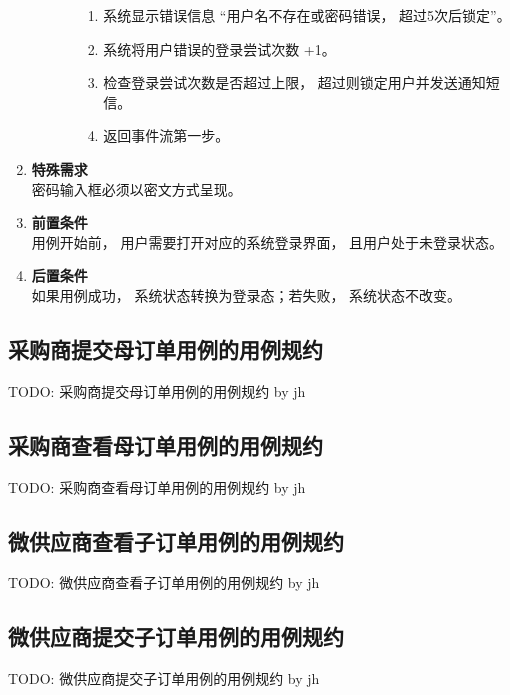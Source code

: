 \begin{enumerate}
\begin{enumerate}
\begin{enumerate}
            \begin{enumerate}
                \item 系统显示错误信息 “用户名不存在或密码错误， 超过5次后锁定”。
                \item 系统将用户错误的登录尝试次数 +1。
                \item 检查登录尝试次数是否超过上限， 超过则锁定用户并发送通知短信。
                \item 返回事件流第一步。
            \end{enumerate}
        \end{enumerate}
    \end{enumerate}
    \item \textbf{特殊需求} \\ 密码输入框必须以密文方式呈现。
    \item \textbf{前置条件} \\ 用例开始前， 用户需要打开对应的系统登录界面， 且用户处于未登录状态。
    \item \textbf{后置条件} \\ 如果用例成功， 系统状态转换为登录态；若失败， 系统状态不改变。
\end{enumerate}


\subsection{采购商提交母订单用例的用例规约}

TODO: 采购商提交母订单用例的用例规约 by jh

\subsection{采购商查看母订单用例的用例规约}

TODO: 采购商查看母订单用例的用例规约 by jh

\subsection{微供应商查看子订单用例的用例规约}

TODO: 微供应商查看子订单用例的用例规约 by jh

\subsection{微供应商提交子订单用例的用例规约}

TODO: 微供应商提交子订单用例的用例规约 by jh

